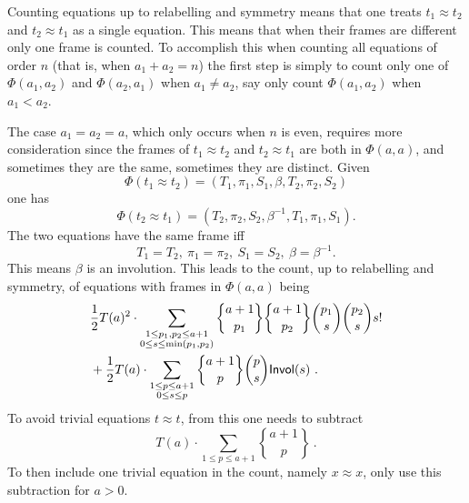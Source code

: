\documentclass[12pt]{amsart}
\newcommand{\Invol}{{\sf Invol}}
\begin{document}
Counting equations up to relabelling and symmetry means that one treats
$t_1 \approx t_2$ and $t_2 \approx t_1$ as a single equation.
This means that when their frames are different only one frame is counted. 
To accomplish this when counting all equations of order $n$ (that is, when $a_1 + a_2 = n$) 
the first step is simply to count
only one of $\Phi(a_1,a_2)$ and $\Phi(a_2,a_1)$ when $a_1 \neq a_2$, say only count $\Phi(a_1,a_2)$
 when $a_1<a_2$. 

The case $a_1=a_2 = a$, which only occurs when $n$ is even, requires more consideration since
the frames of $t_1 \approx t_2$ and $t_2 \approx t_1$ are both in $\Phi(a,a)$, and sometimes
they are the same, sometimes they are distinct.
 Given $$\Phi(t_1 \approx t_2) = (T_1,\pi_1,S_1, \beta, T_2, \pi_2, S_2)$$ one has
 $$\Phi(t_2 \approx t_1) = (T_2, \pi_2, S_2, \beta^{-1}, T_1, \pi_1, S_1).$$
 The two equations have the same frame iff 
 $$T_1 = T_2,\  \pi_1 = \pi_2,\  S_1=S_2,\ \beta = \beta^{-1}.$$ 
 This means $\beta$ is an involution. This leads to the count,
 up to relabelling and symmetry, of
 equations with frames in $\Phi(a,a)$ being
 \begin{align*}
&\frac{1}{2} T(a)^2\cdot \sum_{\substack{1 \le p_1,p_2 \le a+1\\ 0\le s \le \min(p_1,p_2)}} 
{a+1 \brace p_1} {a+1 \brace p_2} {p_1 \choose s} {p_2 \choose s} s! \\
&+ \frac{1}{2} T(a) \cdot \sum_{\substack{1 \le p \le a+1\\ 0\le s \le p}} 
{a+1 \brace p}  {p \choose s}  \Invol(s) \ .
\end{align*}
To avoid trivial equations $t\approx t$, from this one needs to subtract
$$T(a)\cdot \sum_{1\le p \le a+1}  {a+1 \brace p} \ .$$
To then include one trivial equation in the count, namely $x\approx x$, only use this subtraction
for $a>0$.
\end{document}
